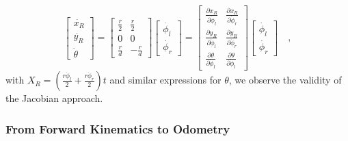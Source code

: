 \begin{equation}
\left[\begin{array}{c} \dot{x_R}\\\dot{y_R}\\\dot{\theta}\end{array}\right]=\left[\begin{array}{cc}
\frac{r}{2} & \frac{r}{2}\\
0 & 0 \\
\frac{r}{d} & -\frac{r}{d} \end{array}\right]
\left[\begin{array}{c}\dot{\phi_l}\\\dot{\phi_r}\end{array}\right]
=
\left[\begin{array}{cc}
\frac{\partial{x_R}}{\partial{\dot{\phi}_l}} & \frac{\partial{x_R}}{\partial{\dot{\phi}_r}}\\\frac{\partial{y_R}}{\partial{\dot{\phi}_l}} & \frac{\partial{y_R}}{\partial{\dot{\phi}_r}}\\\frac{\partial{\theta}}{\partial{\dot{\phi}_l}} & \frac{\partial{\theta}}{\partial{\dot{\phi}_l}} \end{array}\right]
\left[\begin{array}{c}
\dot{\phi_l}\\\dot{\phi_r}
\end{array}\right]\quad,
\end{equation}
with $X_R=\left(\frac{r\dot{\phi}_l}{2}+\frac{r\dot{\phi}_r}{2}\right)t$ and similar expressions for $\theta$, we observe the validity of the Jacobian approach.

\subsubsection{From Forward Kinematics to Odometry}

